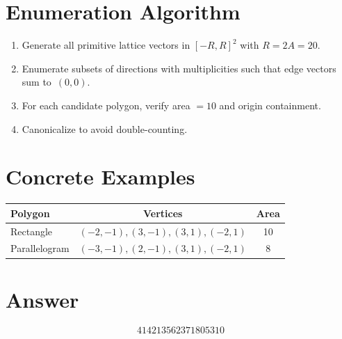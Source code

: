 \documentclass[11pt]{article}
\theoremstyle{definition}
\begin{document}
\section{Enumeration Algorithm}

\begin{enumerate}
    \item Generate all primitive lattice vectors in $[-R, R]^2$ with $R = 2A = 20$.
    \item Enumerate subsets of directions with multiplicities such that edge vectors sum to~$(0,0)$.
    \item For each candidate polygon, verify area $= 10$ and origin containment.
    \item Canonicalize to avoid double-counting.
\end{enumerate}

\section{Concrete Examples}

\begin{center}
\begin{tabular}{lcc}
\toprule
Polygon & Vertices & Area \\
\midrule
Rectangle & $(-2,-1),(3,-1),(3,1),(-2,1)$ & 10 \\
Parallelogram & $(-3,-1),(2,-1),(3,1),(-2,1)$ & 8 \\
\bottomrule
\end{tabular}
\end{center}

\section{Answer}

\[
\boxed{414213562371805310}
\]
\end{document}
